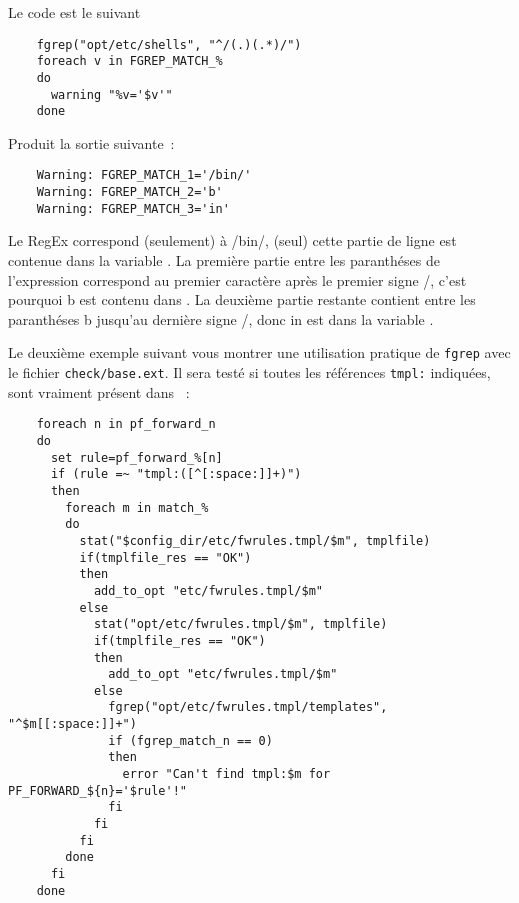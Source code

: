     Le code est le suivant

\begin{example}
\begin{verbatim}
    fgrep("opt/etc/shells", "^/(.)(.*)/")
    foreach v in FGREP_MATCH_%
    do
      warning "%v='$v'"
    done
\end{verbatim}
\end{example}

    Produit la sortie suivante~:

\begin{example}
\begin{verbatim}
    Warning: FGREP_MATCH_1='/bin/'
    Warning: FGREP_MATCH_2='b'
    Warning: FGREP_MATCH_3='in'
\end{verbatim}
\end{example}

	Le RegEx correspond (seulement) à \og{}/bin/\fg{}, (seul) cette partie de ligne est
	contenue dans la variable . La première partie entre les paranthéses
	de l'expression correspond au premier caractère après le premier signe \og{}/\fg{},
	c'est pourquoi \og{}b\fg{} est contenu dans . La deuxième partie
	restante contient entre les paranthéses \og{}b\fg{} jusqu'au dernière signe \og{}/\fg{},
	donc \og{}in\fg{} est dans la variable .

    Le deuxième exemple suivant vous montrer une utilisation pratique de \texttt{fgrep}
	avec le fichier \texttt{check/base.ext}. Il sera testé si toutes les références
	\texttt{tmpl:} indiquées, sont vraiment présent dans ~:

\begin{example}
\begin{verbatim}
    foreach n in pf_forward_n
    do
      set rule=pf_forward_%[n]
      if (rule =~ "tmpl:([^[:space:]]+)")
      then
        foreach m in match_%
        do
          stat("$config_dir/etc/fwrules.tmpl/$m", tmplfile)
          if(tmplfile_res == "OK")
          then
            add_to_opt "etc/fwrules.tmpl/$m"
          else
            stat("opt/etc/fwrules.tmpl/$m", tmplfile)
            if(tmplfile_res == "OK")
            then
              add_to_opt "etc/fwrules.tmpl/$m"
            else
              fgrep("opt/etc/fwrules.tmpl/templates", "^$m[[:space:]]+")
              if (fgrep_match_n == 0)
              then
                error "Can't find tmpl:$m for PF_FORWARD_${n}='$rule'!"
              fi
            fi
          fi
        done
      fi
    done
\end{verbatim}
\end{example}

